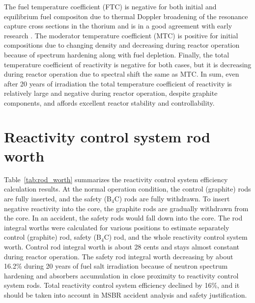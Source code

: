 The fuel temperature coefficient (FTC) is negative for both initial and equilibrium fuel compositon due to thermal Doppler broadening of the resonance capture cross sections in the thorium and is in a good agreement with early research \cite{robertson_conceptual_1971,park_whole_2015}. The moderator temperature coefficient (MTC) is positive for initial compositions due to changing density and decreasing during reactor operation because of spectrum hardening along with fuel depletion. Finally, the total temperature coefficient of reactivity is negative for both cases, but it is decreasing during reactor operation due to spectral shift the same as MTC. In sum, even after 20 years of irradiation the total temperature coefficient of reactivity is relatively large and negative during reactor operation, despite graphite components, and affords excellent reactor stability and controllability.

\section{Reactivity control system rod worth}
Table~\ref{tab:rod_worth} summarizes the reactivity control system efficiency calculation results. At the normal operation condition, the control (graphite) rods are fully inserted, and the safety (B$_4$C) rods are fully withdrawn. To insert negative reactivity into the core, the graphite rods are gradually withdrawn from the core. In an accident, the safety rods would fall down into the core. The rod integral worths were calculated for various positions to estimate separately control (graphite) rod, safety (B$_4$C) rod, and the whole reactivity control system worth. Control rod integral worth is about 28 cents and stays almost constant during reactor operation. The safety rod integral worth decreasing by about 16.2\% during 20 years of fuel salt irradiation because of neutron spectrum hardening and absorbers accumulation in close proximity to reactivity control system rods. Total reactivity control system efficiency declined by 16\%, and it should be taken into account in \gls{MSBR} accident analysis and safety justification.

